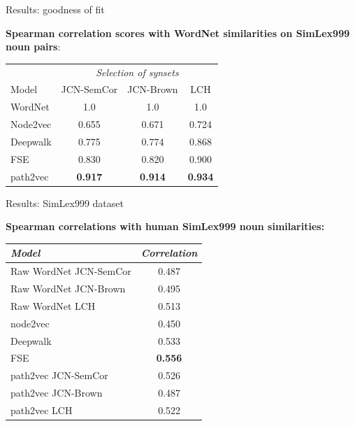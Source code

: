 \begin{frame}{Results: goodness of fit}


\textbf{Spearman correlation scores with WordNet similarities on SimLex999 noun pairs}:

\begin{table}
\begin{tabular}{lccc}
\toprule
& \multicolumn{3}{c}{\textit{Selection of synsets}} \\
Model & JCN-SemCor & JCN-Brown & LCH \\
\midrule
WordNet & 1.0  & 1.0  & 1.0  \\
\midrule
Node2vec & 0.655 & 0.671 & 0.724  \\
Deepwalk & 0.775 & 0.774  & 0.868 \\
FSE & 0.830  & 0.820 & 0.900  \\
\midrule
path2vec & \textbf{0.917}  & \textbf{0.914}  & \textbf{0.934}  \\
\bottomrule
\end{tabular}
\end{table}

\end{frame}




\begin{frame}{Results: SimLex999 dataset}


\textbf{Spearman correlations with human SimLex999 noun similarities:}


\begin{table}
\begin{tabular}{lc}
\toprule
\textit{Model} & \textit{Correlation} \\
\midrule
Raw WordNet JCN-SemCor & 0.487  \\
Raw WordNet JCN-Brown & 0.495  \\
Raw WordNet LCH & 0.513  \\
\midrule
node2vec { \cite{grover2016node2vec}} & 0.450  \\
Deepwalk { \cite{perozzi2014deepwalk}} & 0.533  \\
FSE { \cite{subercaze:2015}} & \textbf{0.556}  \\
path2vec JCN-SemCor & 0.526  \\
path2vec JCN-Brown & 0.487  \\
path2vec LCH & 0.522  \\
\bottomrule
\end{tabular}
\end{table}

\end{frame}



